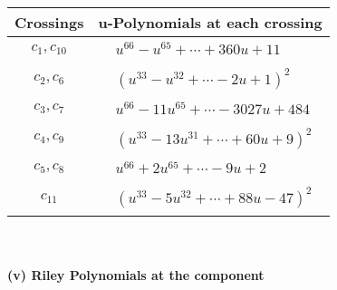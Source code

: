 \documentclass[1p]{elsarticle_modified}
\theoremstyle{definition}
\begin{document}
\begin{tabular}{m{50pt}|m{274pt}}
Crossings & \hspace{64pt}u-Polynomials at each crossing \\
\hline $$\begin{aligned}c_{1},c_{10}\end{aligned}$$&$\begin{aligned}
&u^{66}- u^{65}+\cdots+360 u+11
\end{aligned}$\\
\hline $$\begin{aligned}c_{2},c_{6}\end{aligned}$$&$\begin{aligned}
&(u^{33}- u^{32}+\cdots-2 u+1)^{2}
\end{aligned}$\\
\hline $$\begin{aligned}c_{3},c_{7}\end{aligned}$$&$\begin{aligned}
&u^{66}-11 u^{65}+\cdots-3027 u+484
\end{aligned}$\\
\hline $$\begin{aligned}c_{4},c_{9}\end{aligned}$$&$\begin{aligned}
&(u^{33}-13 u^{31}+\cdots+60 u+9)^{2}
\end{aligned}$\\
\hline $$\begin{aligned}c_{5},c_{8}\end{aligned}$$&$\begin{aligned}
&u^{66}+2 u^{65}+\cdots-9 u+2
\end{aligned}$\\
\hline $$\begin{aligned}c_{11}\end{aligned}$$&$\begin{aligned}
&(u^{33}-5 u^{32}+\cdots+88 u-47)^{2}
\end{aligned}$\\
\hline
\end{tabular}\\~\\
\newpage\renewcommand{\arraystretch}{1}
\flushleft \textbf{(v) Riley Polynomials at the component}\newline \\
\end{document}
